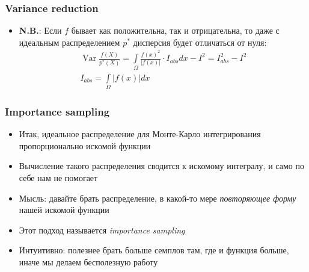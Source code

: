 \documentclass[handout,10pt]{beamer}
\begin{document}
\begin{frame}
\frametitle{Variance reduction}
\begin{itemize}
\item \alert{\textbf{N.B.}}: Если \begin{math}f\end{math} бывает как положительна, так и отрицательна, то даже с идеальным распределением \begin{math}p^*\end{math} дисперсия будет отличаться от нуля:
\begin{gather*}
\operatorname{Var}\frac{f(X)}{p^*(X)} = \int\limits_\Omega \frac{f(x)^2}{|f(x)|}\cdot I_{abs} dx - I^2 = I_{abs}^2 - I^2 \\
I_{abs} = \int\limits_\Omega |f(x)|dx
\end{gather*}
\end{itemize}
\end{frame}

\begin{frame}
\frametitle{Importance sampling}
\begin{itemize}
\item Итак, идеальное распределение для Монте-Карло интегрирования пропорционально искомой функции
\pause
\item Вычисление такого распределения сводится к искомому интегралу, и само по себе нам не помогает
\pause
\item Мысль: давайте брать распределение, в какой-то мере \textit{повторяющее форму} нашей искомой функции
\pause
\item Этот подход называется \textit{importance sampling}
\pause
\item Интуитивно: полезнее брать больше семплов там, где и функция больше, иначе мы делаем бесполезную работу
\end{itemize}
\end{frame}
\end{document}
